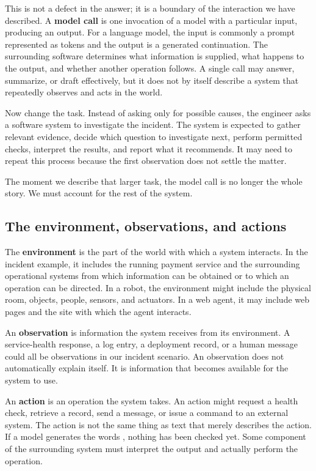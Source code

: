 This is not a defect in the answer; it is a boundary of the interaction we have described. A \textbf{model call} is one invocation of a model with a particular input, producing an output. For a language model, the input is commonly a prompt represented as tokens and the output is a generated continuation. The surrounding software determines what information is supplied, what happens to the output, and whether another operation follows. A single call may answer, summarize, or draft effectively, but it does not by itself describe a system that repeatedly observes and acts in the world.

Now change the task. Instead of asking only for possible causes, the engineer asks a software system to investigate the incident. The system is expected to gather relevant evidence, decide which question to investigate next, perform permitted checks, interpret the results, and report what it recommends. It may need to repeat this process because the first observation does not settle the matter.

The moment we describe that larger task, the model call is no longer the whole story. We must account for the rest of the system.

\subsection{The environment, observations, and actions}\label{the-environment-observations-and-actions}

The \textbf{environment} is the part of the world with which a system interacts. In the incident example, it includes the running payment service and the surrounding operational systems from which information can be obtained or to which an operation can be directed. In a robot, the environment might include the physical room, objects, people, sensors, and actuators. In a web agent, it may include web pages and the site with which the agent interacts.

An \textbf{observation} is information the system receives from its environment. A service-health response, a log entry, a deployment record, or a human message could all be observations in our incident scenario. An observation does not automatically explain itself. It is information that becomes available for the system to use.

An \textbf{action} is an operation the system takes. An action might request a health check, retrieve a record, send a message, or issue a command to an external system. The action is not the same thing as text that merely describes the action. If a model generates the words , nothing has been checked yet. Some component of the surrounding system must interpret the output and actually perform the operation.


